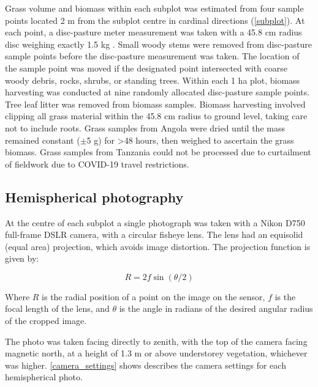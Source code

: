 \documentclass[11pt,a4paper]{article}
\begin{document}
Grass volume and biomass within each subplot was estimated from four sample points located 2 m from the subplot centre in cardinal directions (\autoref{subplot}). At each point, a disc-pasture meter measurement was taken with a 45.8 cm radius disc weighing exactly 1.5 kg \citep{Bransby1977}. Small woody stems were removed from disc-pasture sample points before the disc-pasture measurement was taken. The location of the sample point was moved if the designated point intersected with coarse woody debris, rocks, shrubs, or standing trees. Within each 1 ha plot, biomass harvesting was conducted at nine randomly allocated disc-pasture sample points. Tree leaf litter was removed from biomass samples. Biomass harvesting involved clipping all grass material within the 45.8 cm radius to ground level, taking care not to include roots. Grass samples from Angola were dried until the mass remained constant ($\pm$5 g) for >48 hours, then weighed to ascertain the grass biomass. Grass samples from Tanzania could not be processed due to curtailment of fieldwork due to COVID-19 travel restrictions. 

\subsection{Hemispherical photography}

At the centre of each subplot a single photograph was taken with a Nikon D750 full-frame DSLR camera, with a circular fisheye lens. The lens had an equisolid (equal area) projection, which avoids image distortion. The projection function is given by: 

\begin{equation}
	R = 2f \sin{(\theta{}/2)}
\end{equation}

Where $R$ is the radial position of a point on the image on the sensor, $f$ is the focal length of the lens, and $\theta{}$ is the angle in radians of the desired angular radius of the cropped image. 

The photo was taken facing directly to zenith, with the top of the camera facing magnetic north, at a height of 1.3 m or above understorey vegetation, whichever was higher. \autoref{camera_settings} shows describes the camera settings for each hemispherical photo.
\end{document}
